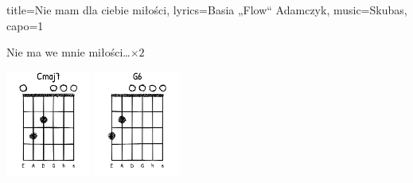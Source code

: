 \begin{song}{title={Nie mam dla ciebie miłości}, lyrics={Basia „Flow“ Adamczyk}, music={Skubas}, capo=1}
\begin{outro}
        Nie ma we mnie miłości\ldots $\times 2$
    \end{outro}
    \begin{center}
        \vfill{}
        \includegraphics[height=3.5cm]{images/Cmaj7.png}
        \hspace{1cm}
        \includegraphics[height=3.5cm]{images/G6-easy.png}
        \vfill{}
    \end{center}
\end{song}

